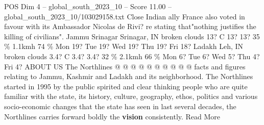 \begin{textsample}{POS Dim 4 – global\_south\_2023\_10 – Score 11.00 – global\_south\_2023\_10/103029158.txt}
Close Indian ally France also voted in favour with its Ambassador Nicolas de Rivi? re stating that"nothing justifies the killing of civilians".
Jammu Srinagar Srinagar, IN broken clouds 13?
C 13? 13? 35 \% 1.1kmh 74 \% Mon 19?
Tue 19?
Wed 19?
Thu 19?
Fri 18?
Ladakh Leh, IN broken clouds 3.4?
C 3.4? 3.4? 32 \% 2.1kmh 66 \% Mon 6?
Tue 6?
Wed 5?
Thu 4?
Fri 4?
ABOUT US The Northlines @ @ @ @ @ @ @ @ @ @ facts and figures relating to Jammu, Kashmir and Ladakh and its neighborhood.
The Northlines started in 1995 by the public spirited and clear thinking people who are quite familiar with the state, its history, culture, geography, ethos, politics and various socio-economic changes that the state has seen in last several decades, the Northlines carries forward boldly the \textbf{vision} consistently.
Read More

\end{textsample}

